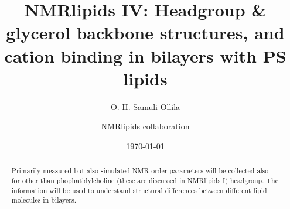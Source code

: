 \documentclass[aps,prl,superscriptaddress,twocolumn]{revtex4}
\begin{document}

\title{NMRlipids IV: Headgroup \& glycerol backbone structures, and cation binding in bilayers with PS lipids} %



\author{O. H. Samuli Ollila}

\author{NMRlipids collaboration }



\date{\today}

\begin{abstract}
  Primarily measured but also simulated NMR order parameters will be collected also for other than phophatidylcholine
  (these are discussed in NMRlipids I) headgroup. The information will be used to understand structural differences between 
  different lipid molecules in bilayers.
\end{abstract}


\maketitle %
\end{document}

